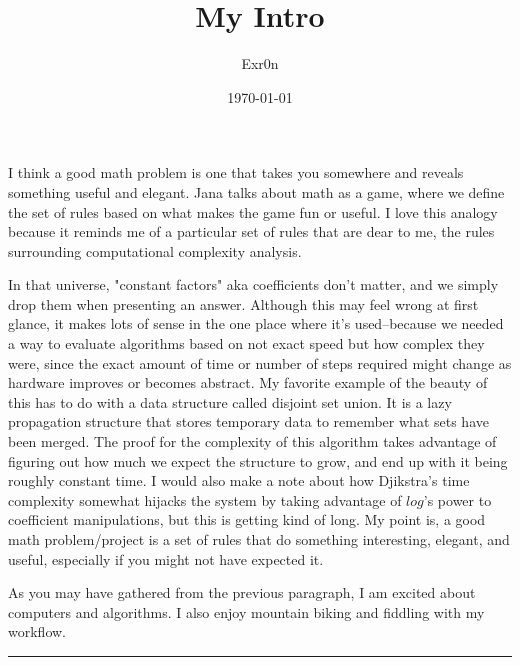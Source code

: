\documentclass[letterpaper]{article}
\author{Exr0n}
\date{\today}
\title{My Intro}
\renewcommand{\tableofcontents}{}
\begin{document}
\tableofcontents

I think a good math problem is one that takes you somewhere and reveals
something useful and elegant. Jana talks about math as a game, where we
define the set of rules based on what makes the game fun or useful. I
love this analogy because it reminds me of a particular set of rules
that are dear to me, the rules surrounding computational complexity
analysis.

In that universe, "constant factors" aka coefficients don't matter, and
we simply drop them when presenting an answer. Although this may feel
wrong at first glance, it makes lots of sense in the one place where
it's used--because we needed a way to evaluate algorithms based on not
exact speed but how complex they were, since the exact amount of time or
number of steps required might change as hardware improves or becomes
abstract. My favorite example of the beauty of this has to do with a
data structure called disjoint set union. It is a lazy propagation
structure that stores temporary data to remember what sets have been
merged. The proof for the complexity of this algorithm takes advantage
of figuring out how much we expect the structure to grow, and end up
with it being roughly constant time. I would also make a note about how
Djikstra's time complexity somewhat hijacks the system by taking
advantage of \(log\)'s power to coefficient manipulations, but this is
getting kind of long. My point is, a good math problem/project is a set
of rules that do something interesting, elegant, and useful, especially
if you might not have expected it.

As you may have gathered from the previous paragraph, I am excited about
computers and algorithms. I also enjoy mountain biking and fiddling with
my workflow.

\noindent\rule{\textwidth}{0.5pt}
\end{document}
